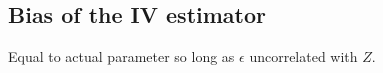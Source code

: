 
\subsection{Bias of the IV estimator}

Equal to actual parameter so long as \(\epsilon \) uncorrelated with \(Z\).

